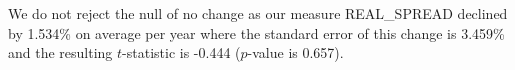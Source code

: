 We do not reject the null of no change as our measure REAL\_SPREAD declined by 1.534\% on average per year where the standard error of this change is 3.459\% and the resulting $t$-statistic is -0.444 ($p$-value is 0.657).